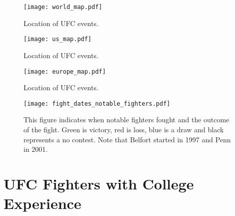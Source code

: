 \documentclass[12pt]{article}
\begin{document}
\begin{figure}[h]
\begin{center}
\texttt{[image: world\_map.pdf]}
\caption{Location of UFC events.}
\end{center}
\end{figure}

\begin{figure}[h]
\begin{center}
\texttt{[image: us\_map.pdf]}
\caption{Location of UFC events.}
\end{center}
\end{figure}

\begin{figure}[h]
\begin{center}
\texttt{[image: europe\_map.pdf]}
\caption{Location of UFC events.}
\end{center}
\end{figure}

\begin{figure}[h]
\begin{center}
\texttt{[image: fight\_dates\_notable\_fighters.pdf]}
\caption{This figure indicates when notable fighters fought and the outcome of the fight. Green is victory, red is loss, blue is a draw
and black represents a no contest. Note that Belfort started in 1997 and Penn in 2001.}
\end{center}
\end{figure}








\appendix


\section{UFC Fighters with College Experience}
\label{appendix_education}
\begin{center}

\end{center}

%
\end{document}
